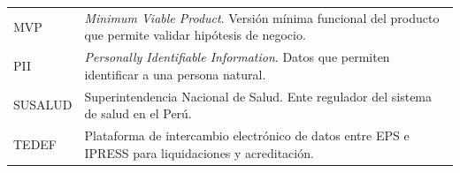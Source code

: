 \begin{table}[H]
\begin{tabular}{
        p{}
        p{}
    }
        MVP
        & \textit{Minimum Viable Product}. Versión mínima funcional del producto
          que permite validar hipótesis de negocio. \\

        PII
        & \textit{Personally Identifiable Information}. Datos que permiten
          identificar a una persona natural. \\

        SUSALUD
        & Superintendencia Nacional de Salud. Ente regulador del sistema
          de salud en el Perú. \\

        TEDEF
        & Plataforma de intercambio electrónico de datos entre EPS e IPRESS
          para liquidaciones y acreditación. \\

        \bottomrule
    \end{tabular}
\end{table}


    
